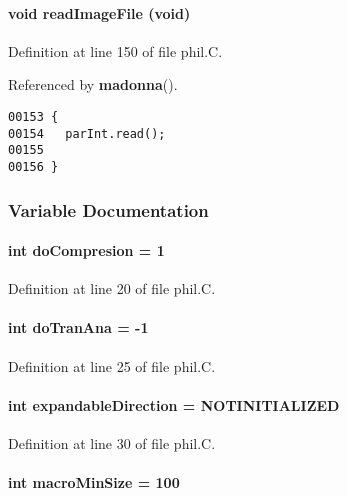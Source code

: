 \paragraph{\setlength{\rightskip}{0pt plus 5cm}void read\-Image\-File (void)}\hfill



Definition at line 150 of file phil.C.

Referenced by {\bf madonna}().\small\begin{verbatim}00153 {
00154   parInt.read();
00155 
00156 }
\end{verbatim}\normalsize 


\subsubsection{Variable Documentation}
\label{phil.C_a8}
\paragraph{\setlength{\rightskip}{0pt plus 5cm}int do\-Compresion = 1}\hfill



Definition at line 20 of file phil.C.\label{phil.C_a12}
\paragraph{\setlength{\rightskip}{0pt plus 5cm}int do\-Tran\-Ana = -1}\hfill



Definition at line 25 of file phil.C.\label{phil.C_a15}
\paragraph{\setlength{\rightskip}{0pt plus 5cm}int expandable\-Direction = NOTINITIALIZED}\hfill



Definition at line 30 of file phil.C.\label{phil.C_a10}
\paragraph{\setlength{\rightskip}{0pt plus 5cm}int macro\-Min\-Size = 100}\hfill



